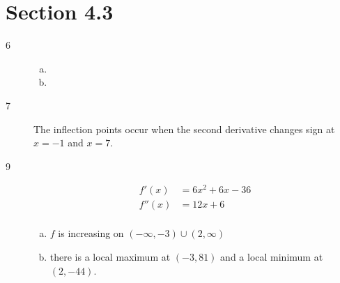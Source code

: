 \documentclass[letterpaper]{exam}
\begin{document}
  \section{Section 4.3} %
  
  \begin{description}

    \item[6] 

      \begin{enumerate}[(a)]
        \item 
          
        \item 
      \end{enumerate}

    \item[7] The inflection points occur when the second derivative changes sign at 
      $x = -1$ and $x = 7$.

    \newpage

    \item[9]

      \begin{align*}
        f'(x)  & = 6x^2 + 6x - 36 \\
        f''(x) & = 12x + 6 \\
      \end{align*}

      \begin{enumerate}[(a)]
        \item $f$ is increasing on $(-\infty, -3) \cup (2, \infty)$

        \item there is a local maximum at $(-3, 81)$ and a local minimum at
          $(2, -44)$.


\end{enumerate}
\end{description}
\end{document}
